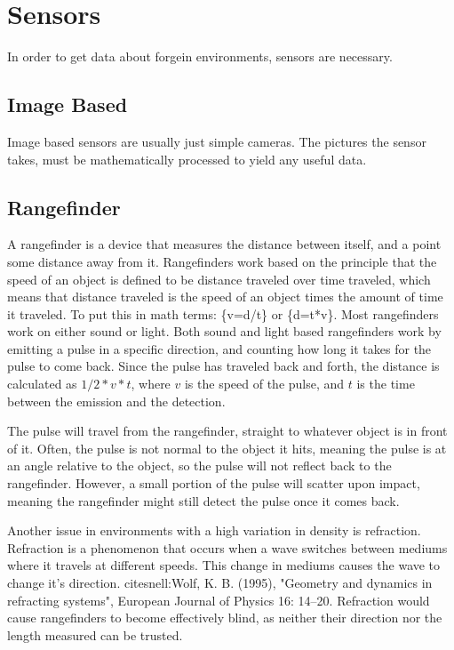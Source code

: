 \clearpage
\section{Sensors}
In order to get data about forgein environments, sensors are necessary.

\subsection{Image Based}
Image based sensors are usually just simple cameras. The pictures the sensor takes, must be mathematically processed to yield any useful data.
\subsection{Rangefinder}
A rangefinder is a device that measures the distance between itself, and a point some distance away from it. Rangefinders work based on the principle that the speed of an object is defined to be distance traveled over time traveled, which means that distance traveled is the speed of an object times the amount of time it traveled. To put this in math terms: \{v=d/t\} or \{d=t*v\}.
Most rangefinders work on either sound or light. Both sound and light based rangefinders work by emitting a pulse in a specific direction, and counting how long it takes for the pulse to come back. Since the pulse has traveled back and forth, the distance is calculated as \(1/2*v*t\), where \(v\) is the speed of the pulse, and \(t\) is the time between the emission and the detection.

The pulse will travel from the rangefinder, straight to whatever object is in front of it. Often, the pulse is not normal to the object it hits, meaning the pulse is at an angle relative to the object, so the pulse will not reflect back to the rangefinder. However, a small portion of the pulse will scatter upon impact, meaning the rangefinder might still detect the pulse once it comes back.

Another issue in environments with a high variation in density is refraction. Refraction is a phenomenon that occurs when a wave switches between mediums where it travels at different speeds. This change in mediums causes the wave to change it's direction. cite{snell:Wolf, K. B. (1995), "Geometry and dynamics in refracting systems", European Journal of Physics 16: 14–20.} Refraction would cause rangefinders to become effectively blind, as neither their direction nor the length measured can be trusted.

